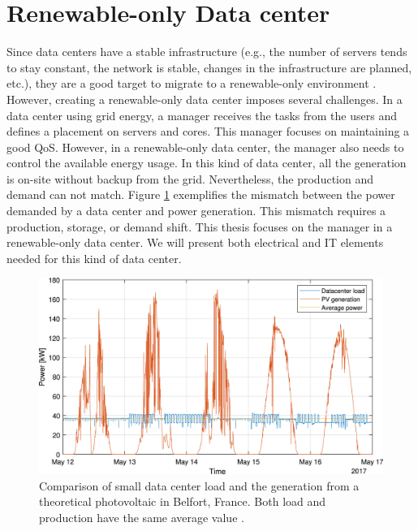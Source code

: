 \section{Renewable-only Data center}
Since data centers have a stable infrastructure (e.g., the number of servers tends to stay constant, the network is stable, changes in the infrastructure are planned, etc.), they are a good target to migrate to a renewable-only environment \cite{rostirolla2022survey}. However, creating a renewable-only data center imposes several challenges. In a data center using grid energy, a manager receives the tasks from the users and defines a placement on servers and cores. This manager focuses on maintaining a good QoS. However, in a renewable-only data center, the manager also needs to control the available energy usage. In this kind of data center, all the generation is on-site without backup from the grid. Nevertheless, the production and demand can not match. Figure \ref{fig:load_production} exemplifies the mismatch between the power demanded by a data center and power generation. This mismatch requires a production, storage, or demand shift. This thesis focuses on the manager in a renewable-only data center. We will present both electrical and IT elements needed for this kind of data center.

\begin{figure}[!htb]
    \centering
    \includegraphics[scale=1]{Images/Related_works/load_production.jpg}
    \caption[Comparison of small data center load and the generation from a theoretical photovoltaic in Belfort, France. Both load and production have the same average value.]{Comparison of small data center load and the generation from a theoretical photovoltaic in Belfort, France. Both load and production have the same average value \cite{rostirolla2022survey}.}
    \label{fig:load_production}
\end{figure}


